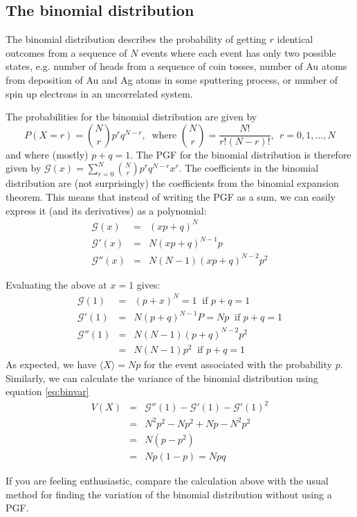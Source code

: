 \documentclass{article}
\newcommand{\calG}{\mathcal{G}}
\begin{document}
\subsection*{The binomial distribution}
The binomial distribution describes the probability of getting $r$ identical outcomes from a sequence of $N$ events where each event has only two possible states, e.g. number of heads from a sequence of coin tosses, number of Au atoms from deposition of Au and Ag atoms in some sputtering process, or number of spin up electrons in an uncorrelated system.

The probabilities for the binomial distribution are given by
$$P(X=r) = \binom{N}{r}p^rq^{N-r}, ~\text{ where } \binom{N}{r} = \frac{N!}{r!(N-r)!}, ~~r=0,1,\ldots,N$$
and where (mostly) $p+q=1$.
The PGF for the binomial distribution is therefore given by $\calG(x) = \sum_{r=0}^N\binom{N}{r}p^rq^{N-r}x^r$. 
The coefficients in the binomial distribution are (not surprisingly) the coefficients from the  binomial expansion theorem. This means that instead of writing the PGF as a sum, we can easily express it (and its derivatives) as a polynomial:
\begin{eqnarray*}
	\calG(x)  &=& (xp +q)^N \\
	\calG'(x) &=& N(xp+q)^{N-1}p\\
	\calG''(x) &=& N(N-1)(xp+q)^{N-2}p^2
\end{eqnarray*}

Evaluating the above at $x=1$ gives:
	\begin{eqnarray*}
	\calG(1) &=& (p+x)^N = 1 ~\text{ if } p+q=1\\
	\calG'(1) &=& N(p+q)^{N-1}P = Np  ~\text{ if } p+q=1\\
	\calG''(1) &=& N(N-1)(p+q)^{N-2}p^2 \\
		&=&N(N-1)p^2  ~\text{ if } p+q=1
\end{eqnarray*}
As expected, we have $\langle X\rangle =Np$ for the event associated with the probability $p$.
Similarly, we can calculate the variance of the binomial distribution using equation \ref{eq:binvar}
\begin{eqnarray*}
	V(X) &=&\calG''(1) - \calG'(1) -\calG'(1)^2\\
		&=& N^2p^2-Np^2+Np-N^2p^2\\
		&=& N(p-p^2)\\
		&=& Np(1-p)= Npq
\end{eqnarray*}

If you are feeling enthusiastic, compare the calculation above with the usual method for finding the variation of the binomial distribution without using a PGF.
\end{document}
